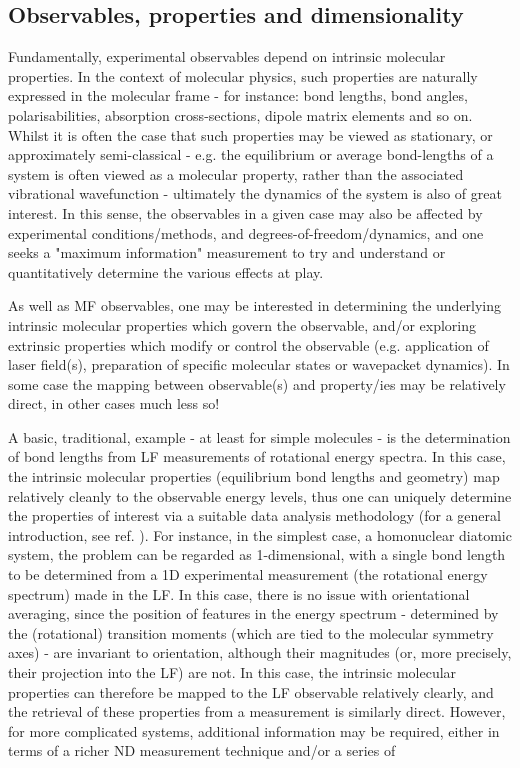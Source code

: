 \subsection{Observables, properties and dimensionality}

Fundamentally, experimental observables depend on intrinsic molecular properties. In the  context of molecular physics, such properties are naturally expressed in the molecular frame - for instance: bond lengths, bond angles, polarisabilities, absorption cross-sections, dipole matrix elements and so on. Whilst it is often the case that such properties may be viewed as stationary, or approximately semi-classical - e.g. the equilibrium or average bond-lengths of a system is often viewed as a molecular property, rather than the associated vibrational wavefunction - ultimately the dynamics of the system is also of great interest. In this sense, the observables in a given case may also be affected by experimental conditions/methods, and degrees-of-freedom/dynamics, and one seeks a "maximum information" measurement to try and understand or quantitatively determine the various effects at play.

As well as MF observables, one may be interested in determining the underlying intrinsic molecular properties which govern the observable, and/or exploring extrinsic properties which modify or control the observable (e.g. application of laser field(s), preparation of specific molecular states or wavepacket dynamics). In some case the mapping between observable(s) and property/ies may be relatively direct, in other cases much less so!

A basic, traditional, example - at least for simple molecules - is the determination of bond lengths from LF measurements of rotational energy spectra. In this case, the intrinsic molecular properties (equilibrium bond lengths and geometry) map relatively cleanly to the observable energy levels, thus one can uniquely determine the properties of interest via a suitable data analysis methodology (for a general introduction, see ref. \cite{hollasHighRes}). For instance, in the simplest case, a homonuclear diatomic system, the problem can be regarded as 1-dimensional, with a single bond length to be determined from a 1D experimental measurement (the rotational energy spectrum) made in the LF. In this case, there is no issue with orientational averaging, since the position of features in the energy spectrum - determined by the (rotational) transition moments (which are tied to the molecular symmetry axes) - are invariant to orientation, although their magnitudes (or, more precisely, their projection into the LF) are not. In this case, the intrinsic molecular properties can therefore be mapped to the LF observable relatively clearly, and the retrieval of these properties from a measurement is similarly direct. However, for more complicated systems, additional information may be required, either in terms of a richer ND measurement technique and/or a series of 

